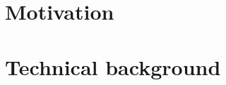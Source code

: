 \appendix

\section*{\appendixname}

\begin{frame}
\sectionpage
\end{frame}

\begin{frame}
\tableofcontents
\end{frame}


\section{Motivation}




\section{Technical background}






